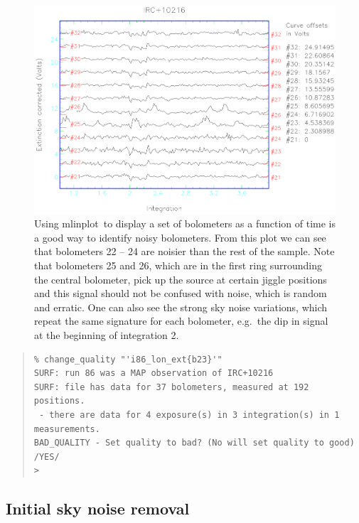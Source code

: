 \documentclass[twoside,11pt]{article}
\newenvironment{myquote}{\begin{quote}\begin{small}}{\end{small}\end{quote}}
\newcommand{\task}[1]{\textsf{#1}}
\newcommand{\mlinplot}{\xref{\task{mlinplot}}{sun95}{MLINPLOT}}
\newcommand{\xref}[3]{#1}
\newcommand{\xlabel}[1]{}
\renewcommand{\_}{\texttt{\symbol{95}}}
\begin{document}
\begin{figure}
\begin{center}
\includegraphics[width=\textwidth]{sc11_fig3.eps}
\caption{Using \mlinplot\ to display a set of bolometers as a function
of time is a good way to identify noisy bolometers.  From this
plot we can see that bolometers 22 -- 24 are noisier than the rest of
the sample.  Note that bolometers 25 and 26, which are in the first
ring surrounding the central bolometer, pick up the source at certain
jiggle positions and this signal should not be confused with noise,
which is random and erratic.  One can also see the strong sky noise
variations, which repeat the same signature for each bolometer, e.g.\ 
the dip in signal at the beginning of integration 2.}


\label{fig:mlin}
\end{center}
\end{figure}


\begin{myquote}
\begin{verbatim}
% change_quality "'i86_lon_ext{b23}'"
SURF: run 86 was a MAP observation of IRC+10216
SURF: file has data for 37 bolometers, measured at 192 positions.
 - there are data for 4 exposure(s) in 3 integration(s) in 1 
measurements.
BAD_QUALITY - Set quality to bad? (No will set quality to good) /YES/ 
> 
\end{verbatim}
\end{myquote}


\subsection{\xlabel{Initial_Sky_Noise_Removal}Initial sky noise 
removal \label{Initial_Sky_Noise_Removal}}
\end{document}
